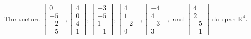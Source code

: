 \begin{exercise}
\begin{exerciseStatement}
  \end{exerciseStatement}
  \begin{exerciseAnswer}
   The vectors \(\left[\begin{array}{r}
0 \\
-5 \\
-2 \\
-5
\end{array}\right] , \left[\begin{array}{r}
4 \\
0 \\
4 \\
1
\end{array}\right] , \left[\begin{array}{r}
-3 \\
-5 \\
1 \\
-1
\end{array}\right] , \left[\begin{array}{r}
4 \\
1 \\
-2 \\
0
\end{array}\right] , \left[\begin{array}{r}
-4 \\
4 \\
-3 \\
3
\end{array}\right] , \text{ and } \left[\begin{array}{r}
4 \\
2 \\
-5 \\
-1
\end{array}\right]\) 
  	 do  
	span \(\mathbb{R}^4\).
  


  \end{exerciseAnswer}
\end{exercise}